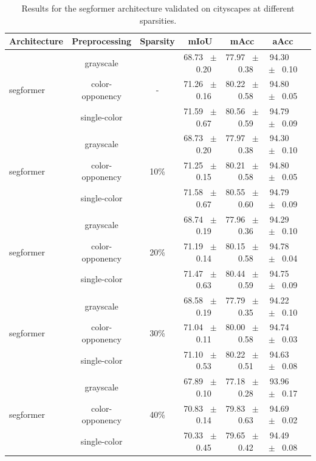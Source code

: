 \begin{table}[h]
  \centering
  \caption{Results for the segformer architecture validated on cityscapes at different sparsities.}
  \begin{tabular}{@{}lccc ccc@{}}
    \toprule
    Architecture & Preprocessing & Sparsity & mIoU & mAcc & aAcc \\
    \midrule

    \multirow{3}{*}{segformer} & grayscale & \multirow{3}{*}{-} & 68.73 ~$\pm$~ 0.20 & 77.97 ~$\pm$~ 0.38 & 94.30 ~$\pm$~ 0.10 \\
    & color-opponency &  & 71.26 ~$\pm$~ 0.16 & 80.22 ~$\pm$~ 0.58 & 94.80 ~$\pm$~ 0.05 \\
    & single-color &  & 71.59 ~$\pm$~ 0.67 & 80.56 ~$\pm$~ 0.59 & 94.79 ~$\pm$~ 0.09 \\
    \midrule
    \multirow{3}{*}{segformer} & grayscale & \multirow{3}{*}{10\%} & 68.73 ~$\pm$~ 0.20 & 77.97 ~$\pm$~ 0.38 & 94.30 ~$\pm$~ 0.10 \\
    & color-opponency &  & 71.25 ~$\pm$~ 0.15 & 80.21 ~$\pm$~ 0.58 & 94.80 ~$\pm$~ 0.05 \\
    & single-color &  & 71.58 ~$\pm$~ 0.67 & 80.55 ~$\pm$~ 0.60 & 94.79 ~$\pm$~ 0.09 \\
    \midrule
    \multirow{3}{*}{segformer} & grayscale & \multirow{3}{*}{20\%} & 68.74 ~$\pm$~ 0.19 & 77.96 ~$\pm$~ 0.36 & 94.29 ~$\pm$~ 0.10 \\
    & color-opponency &  & 71.19 ~$\pm$~ 0.14 & 80.15 ~$\pm$~ 0.58 & 94.78 ~$\pm$~ 0.04 \\
    & single-color &  & 71.47 ~$\pm$~ 0.63 & 80.44 ~$\pm$~ 0.59 & 94.75 ~$\pm$~ 0.09 \\
    \midrule
    \multirow{3}{*}{segformer} & grayscale & \multirow{3}{*}{30\%} & 68.58 ~$\pm$~ 0.19 & 77.79 ~$\pm$~ 0.35 & 94.22 ~$\pm$~ 0.10 \\
    & color-opponency &  & 71.04 ~$\pm$~ 0.11 & 80.00 ~$\pm$~ 0.58 & 94.74 ~$\pm$~ 0.03 \\
    & single-color &  & 71.10 ~$\pm$~ 0.53 & 80.22 ~$\pm$~ 0.51 & 94.63 ~$\pm$~ 0.08 \\
    \midrule
    \multirow{3}{*}{segformer} & grayscale & \multirow{3}{*}{40\%} & 67.89 ~$\pm$~ 0.10 & 77.18 ~$\pm$~ 0.28 & 93.96 ~$\pm$~ 0.17 \\
    & color-opponency &  & 70.83 ~$\pm$~ 0.14 & 79.83 ~$\pm$~ 0.63 & 94.69 ~$\pm$~ 0.02 \\
    & single-color &  & 70.33 ~$\pm$~ 0.45 & 79.65 ~$\pm$~ 0.42 & 94.49 ~$\pm$~ 0.08 \\

\end{tabular}
\end{table}
